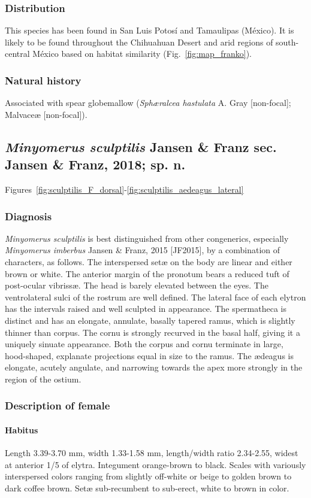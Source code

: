 \documentclass[fleqn,10pt,lineno]{wlpeerj} %
\begin{document}
		\subsubsection*{Distribution}
			This species has been found in San Luis Potos\'{i} and Tamaulipas (M\'{e}xico).
			It is likely to be found throughout the Chihuahuan Desert and arid regions of south-central M\'{e}xico based on habitat similarity (Fig.~\ref{fig:map_franko}).
		\subsubsection*{Natural history}
			Associated with spear globemallow (\textit{Sph{\ae}ralcea hastulata} A. Gray [non-focal]; Malvace{\ae} [non-focal]).

	\subsection*{\textit{Minyomerus sculptilis} Jansen \& Franz sec. Jansen \& Franz, 2018; sp. n.}\label{ssec:sculpt}
		Figures~\ref{fig:sculptilis_F_dorsal}-\ref{fig:sculptilis_aedeagus_lateral}
		\subsubsection*{Diagnosis}
			\textit{Minyomerus sculptilis} is best distinguished from other congenerics, especially \textit{Minyomerus imberbus} Jansen \& Franz, 2015 [JF2015], by a combination of characters, as follows.
			The interspersed set{\ae} on the body are linear and either brown or white.
			The anterior margin of the pronotum bears a reduced tuft of post-ocular vibriss{\ae}.
			The head is barely elevated between the eyes.
			The ventrolateral sulci of  the rostrum are well defined.
			The lateral face of each elytron has the intervals raised and well sculpted in appearance.
			The spermatheca is distinct and has an elongate, annulate, basally tapered ramus, which is slightly thinner than corpus.
			The cornu is strongly recurved in the basal half, giving it a uniquely sinuate appearance.
			Both the corpus and cornu terminate in large, hood-shaped, explanate projections equal in size to the ramus.
			The {\ae}deagus is elongate, acutely angulate, and narrowing towards the apex more strongly in the region of the ostium.
		\subsubsection*{Description of female}
			\paragraph{Habitus}
				Length 3.39-3.70 mm, width 1.33-1.58 mm, length/width ratio 2.34-2.55, widest at anterior 1/5 of elytra.
				Integument orange-brown to black.
				Scales with variously interspersed colors ranging from slightly off-white or beige to golden brown to dark coffee brown.
				Set{\ae} sub-recumbent to sub-erect, white to brown in color.
\end{document}
